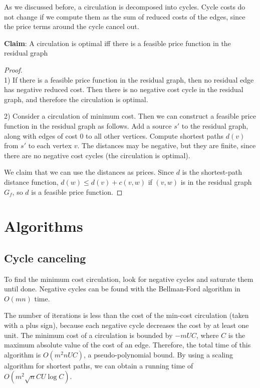 \documentclass{article}
\begin{document}
As we discussed before, a circulation is decomposed into cycles. Cycle costs do not change if we compute them as the sum of reduced costs of the edges, since the price terms around the cycle cancel out. 

\textbf{Claim}:
A circulation is optimal iff there is a feasible price function in the residual graph

\begin{proof}\\
1) If there is a feasible price function in the residual graph, then no residual edge has negative reduced cost. Then there is no negative cost cycle in the residual graph, and therefore the circulation is optimal.

2) Consider a circulation of minimum cost.  Then we can construct a feasible price function in the residual graph as follows.
Add a source $s'$ to the residual graph, along with edges of cost 0 to all other vertices. Compute shortest paths $d(v)$ from $s'$ to each vertex $v$. The distances may be negative, but they are finite, since there are no negative cost cycles (the circulation is optimal). 

We claim that we can use the distances as prices. Since $d$ is the shortest-path distance function, $d(w) \leq d(v) + c(v, w)$ if $(v, w)$ is in the residual graph $G_f$, so $d$ is a feasible price function.   
\end{proof}

\section{Algorithms}

\subsection{Cycle canceling} 
To find the minimum cost circulation, look for negative cycles and saturate them until done. Negative cycles can be found with the Bellman-Ford algorithm in $O(mn)$ time. 

The number of iterations is less than the cost of the min-cost circulation (taken with a plus sign), because each negative cycle decreases the cost by at least one unit. The minimum cost of a circulation is bounded by $-mUC$, where $C$ is the maximum absolute value of the cost of an edge.  Therefore, the total time of this algorithm is $O(m^2nUC)$, a pseudo-polynomial bound.  By using a scaling algorithm for shortest paths, we can obtain a running time of $O(m^2\sqrt n CU \log C)$.
\end{document}
